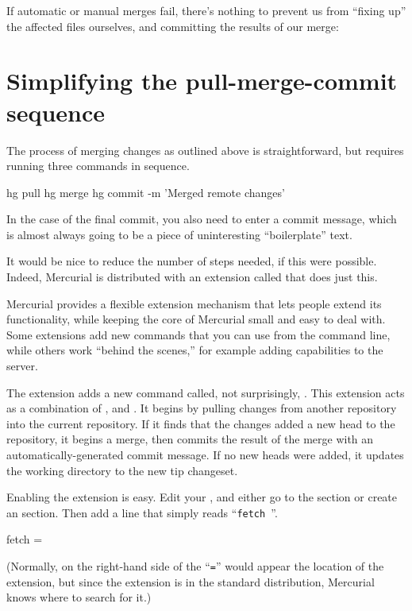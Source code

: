If automatic or manual merges fail, there's nothing to prevent us from
``fixing up'' the affected files ourselves, and committing the results
of our merge:

\section{Simplifying the pull-merge-commit sequence}
\label{sec:tour-merge:fetch}

The process of merging changes as outlined above is straightforward,
but requires running three commands in sequence.
\begin{codesample2}
  hg pull
  hg merge
  hg commit -m 'Merged remote changes'
\end{codesample2}
In the case of the final commit, you also need to enter a commit
message, which is almost always going to be a piece of uninteresting
``boilerplate'' text.

It would be nice to reduce the number of steps needed, if this were
possible.  Indeed, Mercurial is distributed with an extension called
 that does just this.

Mercurial provides a flexible extension mechanism that lets people
extend its functionality, while keeping the core of Mercurial small
and easy to deal with.  Some extensions add new commands that you can
use from the command line, while others work ``behind the scenes,''
for example adding capabilities to the server.

The  extension adds a new command called, not
surprisingly, .  This extension acts as a combination of
,  and .  It begins by pulling
changes from another repository into the current repository.  If it
finds that the changes added a new head to the repository, it begins a
merge, then commits the result of the merge with an
automatically-generated commit message.  If no new heads were added,
it updates the working directory to the new tip changeset.

Enabling the  extension is easy.  Edit your
, and either go to the  section
or create an  section.  Then add a line that
simply reads ``\Verb+fetch +''.
\begin{codesample2}
  [extensions]
  fetch =
\end{codesample2}
(Normally, on the right-hand side of the ``\texttt{=}'' would appear
the location of the extension, but since the  extension
is in the standard distribution, Mercurial knows where to search for
it.)

